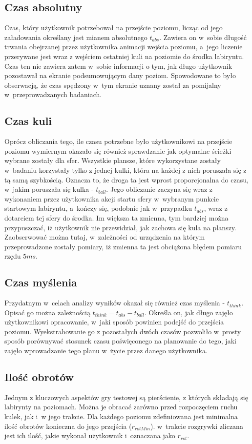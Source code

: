 \documentclass[a4paper,12pt,numbers=noenddot]{report}
\begin{document}
	\subsection{Czas absolutny}
Czas, który użytkownik potrzebował na przejście poziomu, licząc od jego załadowania określany jest mianem absolutnego $t_{abs}$. Zawiera on w~sobie długość trwania obejrzanej przez użytkownika animacji wejścia poziomu, a~jego liczenie przerywane jest wraz z wejściem ostatniej kuli na poziomie do środka labiryntu. Czas ten nie zawiera zatem w~sobie informacji o tym, jak długo użytkownik pozostawał na ekranie podsumowującym dany poziom. Spowodowane to było obserwacją, że czas spędzony w~tym ekranie uznany został za pomijalny w~przeprowadzanych badaniach.
	\subsection{Czas kuli}
Oprócz obliczania tego, ile czasu potrzebne było użytkownikowi na przejście poziomu wymiernym okazało się również sprawdzanie jak optymalne ścieżki wybrane zostały dla sfer. Wszystkie plansze, które wykorzystane zostały w~badaniu korzystały tylko z jednej kulki, która na każdej z nich poruszała się z tą samą szybkością. Oznacza to, że droga ta jest wprost proporcjonalna do czasu, w~jakim poruszała się kulka - $t_{ball}$. Jego obliczanie zaczyna się wraz z wykonaniem przez użytkownika akcji startu sfery w~wybranym punkcie startowym labiryntu, a~kończy się, podobnie jak w~przypadku $t_{abs}$, wraz z dotarciem tej sfery do środka. Im większa ta zmienna, tym bardziej można przypuszczać, iż użytkownik nie przewidział, jak zachowa się kula na planszy. Zaobserwować można tutaj, w~zależności od urządzenia na którym przeprowadzone zostały pomiary, iż zmienna ta jest obciążona błędem pomiaru rzędu $5 ms$.
	\subsection{Czas myślenia}
Przydatnym w~celach analizy wyników okazał się również czas myślenia - $t_{think}$. Opisać go można zależnością $t_{think} = t_{abs} - t_{ball}$. Określa on, jak długo zajęło użytkownikowi opracowanie, w~jaki sposób powinien podejść do przejścia poziomu. Wyekstrahowanie go z pozostałych dwóch czasów pozwoliło w~prosty sposób porównywać stosunek czasu poświęconego na planowanie do tego, jaki zajęło wprowadzanie tego planu w~życie przez danego użytkownika.
	\subsection{Ilość obrotów}
Jednym z kluczowych aspektów gry testowej są pierścienie, z których składają się labirynty na poziomach. Można je obracać zarówno przed rozpoczęciem ruchu kulek, jak i~w jego trakcie. Dla każdego poziomu zdefiniowana jest minimalna ilość obrotów konieczna do jego przejścia ($r_{rotMin}$). w~trakcie rozgrywki zliczana jest ich ilość, jakie wykonał użytkownik i~oznaczana jako $r_{rot}$. 
\end{document}
